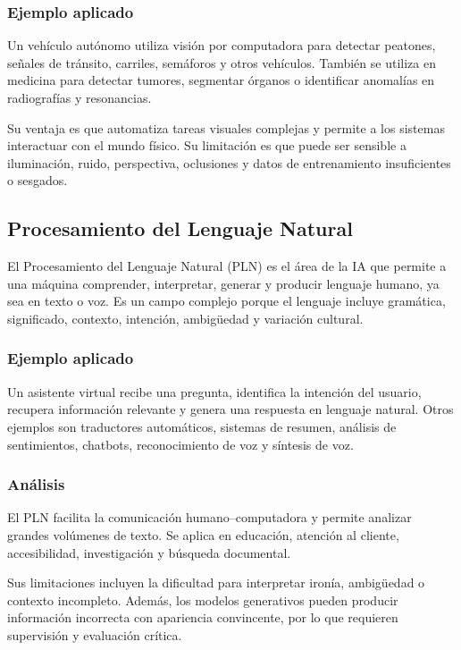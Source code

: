 \subsubsection{Ejemplo aplicado}

Un vehículo autónomo utiliza visión por computadora para detectar peatones, señales de tránsito, carriles, semáforos y otros vehículos. También se utiliza en medicina para detectar tumores, segmentar órganos o identificar anomalías en radiografías y resonancias.

Su ventaja es que automatiza tareas visuales complejas y permite a los sistemas interactuar con el mundo físico. Su limitación es que puede ser sensible a iluminación, ruido, perspectiva, oclusiones y datos de entrenamiento insuficientes o sesgados.

\subsection{Procesamiento del Lenguaje Natural}

El Procesamiento del Lenguaje Natural (PLN) es el área de la IA que permite a una máquina comprender, interpretar, generar y producir lenguaje humano, ya sea en texto o voz. Es un campo complejo porque el lenguaje incluye gramática, significado, contexto, intención, ambigüedad y variación cultural.

\subsubsection{Ejemplo aplicado}

Un asistente virtual recibe una pregunta, identifica la intención del usuario, recupera información relevante y genera una respuesta en lenguaje natural. Otros ejemplos son traductores automáticos, sistemas de resumen, análisis de sentimientos, chatbots, reconocimiento de voz y síntesis de voz.

\subsubsection{Análisis}

El PLN facilita la comunicación humano--computadora y permite analizar grandes volúmenes de texto. Se aplica en educación, atención al cliente, accesibilidad, investigación y búsqueda documental.

Sus limitaciones incluyen la dificultad para interpretar ironía, ambigüedad o contexto incompleto. Además, los modelos generativos pueden producir información incorrecta con apariencia convincente, por lo que requieren supervisión y evaluación crítica.

